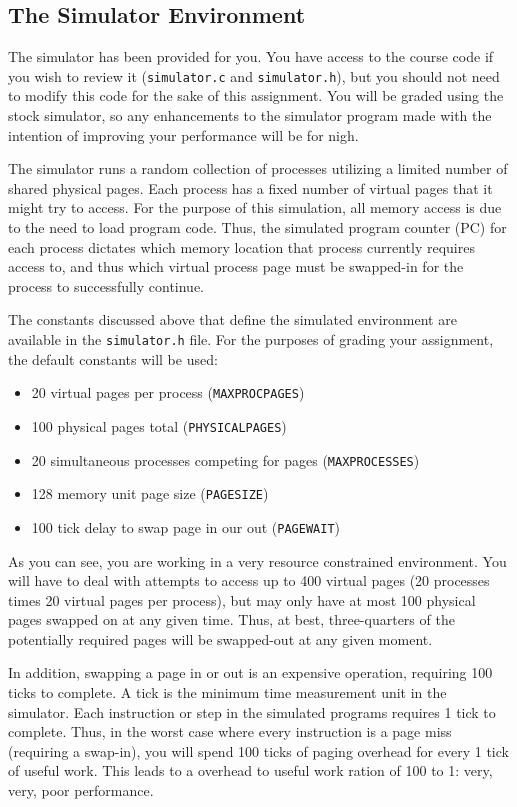 \documentclass[12pt]{article}
\begin{document}
\subsection {The Simulator Environment}

The simulator has been provided for you. You have access to the course
code if you wish to review it (\texttt{simulator.c} and
\texttt{simulator.h}), but you
should not need to modify this code for the sake of this
assignment. You will be graded using the stock simulator, so any
enhancements to the simulator program made with the intention of
improving your performance will be for nigh.

The simulator runs a random collection of processes utilizing a limited
number of shared physical pages. Each process has a fixed number of
virtual pages that it might try to access. For the purpose of this
simulation, all memory access is due to the need to load program
code. Thus, the simulated program counter (PC) for each process
dictates which memory location that process currently requires access
to, and thus which virtual process page must be swapped-in for the
process to successfully continue.

The constants discussed above that define the simulated environment
are available in the \texttt{simulator.h} file. For the purposes of
grading your assignment, the default constants will be used:

\begin{itemize}
\item 20 virtual pages per process (\texttt{MAXPROCPAGES})
\item 100 physical pages total (\texttt{PHYSICALPAGES})
\item 20 simultaneous processes competing for pages (\texttt{MAXPROCESSES})
\item 128 memory unit page size (\texttt{PAGESIZE})
\item 100 tick delay to swap page in our out (\texttt{PAGEWAIT})
\end{itemize}

As you can see, you are working in a very resource constrained
environment. You will have to deal with attempts to access up to 400
virtual pages (20 processes times 20 virtual pages per process), but
may only have at most 100 physical pages swapped on at any given
time. Thus, at best, three-quarters of the potentially required pages
will be swapped-out at any given moment.

In addition, swapping a page
in or out is an expensive operation, requiring 100 ticks to
complete. A tick is the minimum time measurement unit in the
simulator. Each instruction or step in the simulated programs requires 1
tick to complete. Thus, in the worst case where every instruction is a
page miss (requiring a swap-in), you will spend 100 ticks of paging
overhead for every 1 tick of useful work. This leads to a overhead to
useful work ration of 100 to 1: very, very, poor performance.
\end{document}
